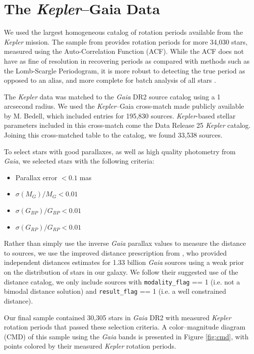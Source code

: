 \documentclass[preprint2]{aastex62}
\newcommand{\Kepler}{\textsl{Kepler}\xspace}
\begin{document}
\section{The \Kepler--Gaia Data}

We used the largest homogeneous catalog of rotation periods available from the \Kepler mission. The sample from \citet{mcquillan2014} provides rotation periods for more 34,030 stars, measured using the Auto-Correlation Function (ACF). While the ACF does not have as fine of resolution in recovering periods as compared with methods such as the Lomb-Scargle Periodogram, it is more robust to detecting the true period as opposed to an alias, and more complete for batch analysis of all stars \citep[e.g. see][]{aigrain2015}.

The \Kepler data was matched to the {\em Gaia} DR2 source catalog using a 1 arcsecond radius. We used the \Kepler--Gaia cross-match made publicly available by M. Bedell, which included entries for 195,830 sources. \Kepler-based stellar parameters included in this cross-match come the Data Release 25 \Kepler catalog. Joining this cross-matched table to the \citet{mcquillan2014} catalog, we found 33,538 sources.

To select stars with good parallaxes, as well as high quality photometry from {\em Gaia}, we selected stars with the following criteria:
\begin{itemize}
\item Parallax error $< 0.1$ mas
\item $\sigma(M_{G}) / M_{G} < 0.01$
\item $\sigma(G_{BP}) /G_{BP} < 0.01$
\item $\sigma(G_{RP}) /G_{RP} < 0.01$
\end{itemize}

Rather than simply use the inverse {\em Gaia} parallax values to measure the distance to sources, we use the improved distance prescription from \citet{bailer-jones2018}, who provided independent distances estimates for 1.33 billion {\em Gaia} sources using a weak prior on the distribution of stars in our galaxy. We follow their suggested use of the distance catalog, we only include sources with {\tt modality\_flag} == 1 (i.e. not a bimodal distance solution) and {\tt result\_flag} == 1 (i.e. a well constrained distance).
              

Our final sample contained 30,305 stars in {\em Gaia} DR2 with measured \Kepler rotation periods that passed these selection criteria. A color--magnitude diagram (CMD) of this sample using the {\em Gaia} bands is presented in Figure \ref{fig:cmd}, with points colored by their measured \Kepler rotation periods.
\end{document}
